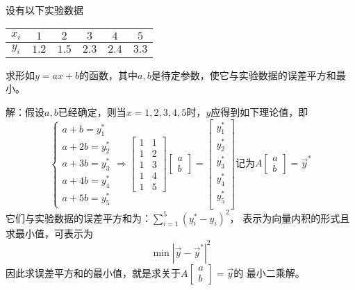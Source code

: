 \begin{eg}
设有以下实验数据
\begin{table}[H]
\centering
\begin{tabular}{cccccc}
  \hline
   $x_i$ & $1$ & $2$ & $3$ & $4$ & $5$ \\
   \hline
   $y_i$ & $1.2$ & $1.5$ & $2.3$ & $2.4$ & $3.3$ \\
  \hline
\end{tabular}
\end{table}
求形如$y=ax+b$的函数，其中$a,b$是待定参数，使它与实验数据的误差平方和最小。
\end{eg}
解：假设$a,b$已经确定，则当$x=1,2,3,4,5$时，$y$应得到如下理论值，即
\begin{equation*}
\begin{cases}
a+b=y_1^*\\
a+2b=y_2^*\\
a+3b=y_3^*\\
a+4b=y_4^*\\
a+5b=y_5^*
\end{cases}
\Rightarrow
\begin{bmatrix}
1&1\\1&2\\1&3\\1&4\\1&5
\end{bmatrix}
\begin{bmatrix}
a\\b
\end{bmatrix}
=\begin{bmatrix}y_1^*\\y_2^*\\y_3^*\\y_4^*\\y_5^*\\\end{bmatrix}
\text{记为}
A\begin{bmatrix}
a\\b
\end{bmatrix}
=\vec{y}^*
\end{equation*}
它们与实验数据的误差平方和为：$\sum_{i=1}^5(y_i^*-y_i)^2$，
表示为向量内积的形式且求最小值，可表示为
\begin{equation*}
\min|\vec{y}-\vec{y}^*|^2
\end{equation*}
因此求误差平方和的最小值，就是求关于$A\begin{bmatrix}a\\b\end{bmatrix}=\vec{y}$的
最小二乘解。\\
